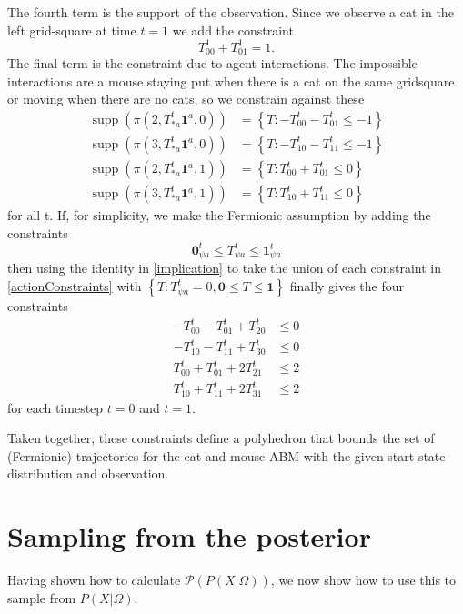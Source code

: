 \documentclass{article}
\DeclareMathOperator\supp{supp}
\begin{document}
The fourth term is the support of the observation. Since we observe a cat in the left grid-square at time $t=1$ we add the constraint
\[
T^1_{0 0} + T^1_{0 1} = 1.
\]
The final term is the constraint due to agent interactions. The impossible interactions are a mouse staying put when there is a cat on the same gridsquare or moving when there are no cats, so we constrain against these
\begin{equation}
\begin{aligned}
\supp(\pi(2,T^t_{* a}\mathbf{1}^a,0)) &= \left\{ T: -T^t_{0 0} - T^t_{0 1} \le -1 \right\}\\
\supp(\pi(3,T^t_{* a}\mathbf{1}^a,0)) &= \left\{ T: -T^t_{1 0} - T^t_{1 1} \le -1 \right\}\\
\supp(\pi(2,T^t_{* a}\mathbf{1}^a,1)) &= \left\{ T: T^t_{0 0} + T^t_{0 1} \le 0 \right\}\\
\supp(\pi(3,T^t_{* a}\mathbf{1}^a,1)) &= \left\{ T: T^t_{1 0} + T^t_{1 1} \le 0 \right\}
\end{aligned}
\label{actionConstraints}
\end{equation}
for all t. If, for simplicity, we make the Fermionic assumption by adding the constraints
\[
\mathbf{0}^t_{\psi a} \le T^t_{\psi a} \le \mathbf{1}^t_{\psi a}
\]
then using the identity in \eqref{implication} to take the union of each constraint in \eqref{actionConstraints} with $\left\{T: T^t_{\psi a} = 0, \mathbf{0} \le T \le \mathbf{1}\right\}$ finally gives the four constraints
\[
\begin{aligned}
-T^t_{0 0} - T^t_{0 1} + T^t_{2 0} & \le 0\\
-T^t_{1 0} - T^t_{1 1} + T^t_{3 0} & \le 0\\
T^t_{0 0} + T^t_{0 1} + 2T^t_{2 1} & \le 2 \\
T^t_{1 0} + T^t_{1 1} + 2T^t_{3 1} & \le 2
\end{aligned}
\]
for each timestep $t=0$ and $t=1$.

Taken together, these constraints define a polyhedron that bounds the set of (Fermionic) trajectories for the cat and mouse ABM with the given start state distribution and observation.

\section{Sampling from the posterior}
\label{samplingFromThePosterior}
Having shown how to calculate $\mathcal{P}(P(X|\Omega))$, we now show how to use this to sample from $P(X|\Omega)$.
\end{document}

